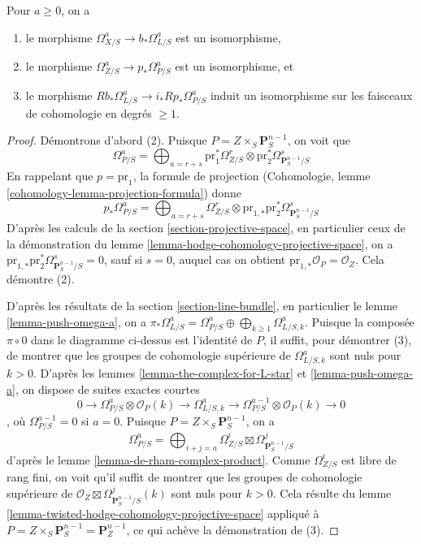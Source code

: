 \begin{lemma}
\label{lemma-comparison}
Pour $a \geq 0$, on a
\begin{enumerate}
\item le morphisme
$\Omega^a_{X/S} \to b_*\Omega^a_{L/S}$ est un isomorphisme,
\item le morphisme $\Omega^a_{Z/S} \to p_*\Omega^a_{P/S}$ est un isomorphisme,
et
\item le morphisme $Rb_*\Omega^a_{L/S} \to i_*Rp_*\Omega^a_{P/S}$ induit un isomorphisme
sur les faisceaux de cohomologie en degrés $\geq 1$.
\end{enumerate}
\end{lemma}

\begin{proof}
Démontrons d'abord (2). Puisque
$P = Z \times_S \mathbf{P}^{n - 1}_S$,
on voit que
$$
\Omega^a_{P/S} = \bigoplus\nolimits_{a = r + s}
\text{pr}_1^*\Omega^r_{Z/S} \otimes
\text{pr}_2^*\Omega^s_{\mathbf{P}^{n - 1}_S/S}
$$
En rappelant que $p = \text{pr}_1$, la formule de projection
(Cohomologie, lemme \ref{cohomology-lemma-projection-formula})
donne
$$
p_*\Omega^a_{P/S} = \bigoplus\nolimits_{a = r + s}
\Omega^r_{Z/S} \otimes
\text{pr}_{1, *}\text{pr}_2^*\Omega^s_{\mathbf{P}^{n - 1}_S/S}
$$
D'après les calculs de la section \ref{section-projective-space},
en particulier ceux de la
démonstration du lemme \ref{lemma-hodge-cohomology-projective-space},
on a $\text{pr}_{1, *}\text{pr}_2^*\Omega^s_{\mathbf{P}^{n - 1}_S/S} = 0$,
sauf si $s = 0$, auquel cas on obtient
$\text{pr}_{1, *}\mathcal{O}_P = \mathcal{O}_Z$.
Cela démontre (2).

\medskip\noindent
D'après les résultats de la section \ref{section-line-bundle}, en particulier
le lemme \ref{lemma-push-omega-a}, on a
$\pi_*\Omega^a_{L/S} = \Omega^a_{P/S} \oplus
\bigoplus_{k \geq 1} \Omega^a_{L/S, k}$.
Puisque la composée $\pi \circ 0$ dans le diagramme ci-dessus
est l'identité de $P$, il suffit, pour démontrer (3), de montrer que
les groupes de cohomologie supérieure de $\Omega^a_{L/S, k}$ sont nuls pour $k > 0$.
D'après les lemmes \ref{lemma-the-complex-for-L-star} et \ref{lemma-push-omega-a},
on dispose de suites exactes courtes
$$
0 \to \Omega^a_{P/S} \otimes \mathcal{O}_P(k)
\to \Omega^a_{L/S, k} \to
\Omega^{a - 1}_{P/S} \otimes \mathcal{O}_P(k) \to 0
$$,
où $\Omega^{a - 1}_{P/S} = 0$ si $a = 0$. Puisque
$P = Z \times_S \mathbf{P}^{n - 1}_S$, on a
$$
\Omega^a_{P/S} = \bigoplus\nolimits_{i + j = a}
\Omega^i_{Z/S} \boxtimes \Omega^j_{\mathbf{P}^{n - 1}_S/S}
$$
d'après le lemme \ref{lemma-de-rham-complex-product}.
Comme $\Omega^i_{Z/S}$ est libre de rang fini,
on voit qu'il suffit de montrer que les groupes de cohomologie supérieure de
$\mathcal{O}_Z \boxtimes \Omega^j_{\mathbf{P}^{n - 1}_S/S}(k)$
sont nuls pour $k > 0$. Cela résulte du
lemme \ref{lemma-twisted-hodge-cohomology-projective-space}
appliqué à $P = Z \times_S \mathbf{P}^{n - 1}_S = \mathbf{P}^{n - 1}_Z$,
ce qui achève la démonstration de (3).


\end{proof}
